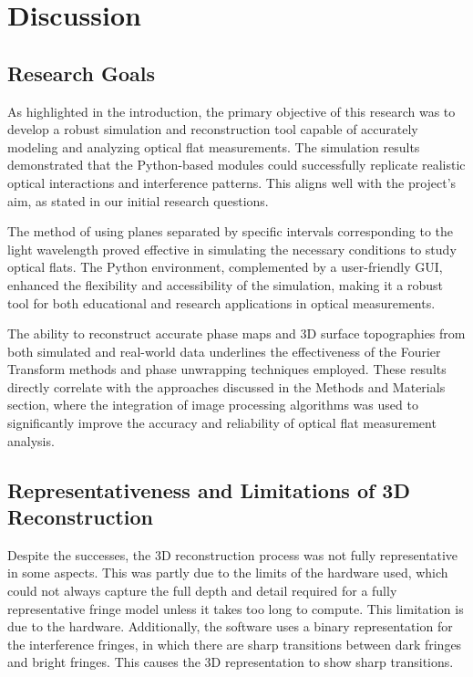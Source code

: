\documentclass[../main.tex]{subfiles}
\begin{document}
{\let\clearpage\relax\chapter{Discussion}}

\section{Research Goals}
\vspace{-15pt}
As highlighted in the introduction, the primary objective of this research was to develop a robust simulation and reconstruction tool capable of accurately modeling and analyzing optical flat measurements. The simulation results demonstrated that the Python-based modules could successfully replicate realistic optical interactions and interference patterns. This aligns well with the project's aim, as stated in our initial research questions.

The method of using planes separated by specific intervals corresponding to the light wavelength proved effective in simulating the necessary conditions to study optical flats. The Python environment, complemented by a user-friendly GUI, enhanced the flexibility and accessibility of the simulation, making it a robust tool for both educational and research applications in optical measurements.

The ability to reconstruct accurate phase maps and 3D surface topographies from both simulated and real-world data underlines the effectiveness of the Fourier Transform methods and phase unwrapping techniques employed. These results directly correlate with the approaches discussed in the Methods and Materials section, where the integration of image processing algorithms was used to significantly improve the accuracy and reliability of optical flat measurement analysis.
\vspace{-15pt}
\section{Representativeness and Limitations of 3D Reconstruction}
\vspace{-15pt}
Despite the successes, the 3D reconstruction process was not fully representative in some aspects. This was partly due to the limits of the hardware used, which could not always capture the full depth and detail required for a fully representative fringe model unless it takes too long to compute. This limitation is due to the hardware. Additionally, the software uses a binary representation for the interference fringes, in which there are sharp transitions between dark fringes and bright fringes. This causes the 3D representation to show sharp transitions.
\end{document}
